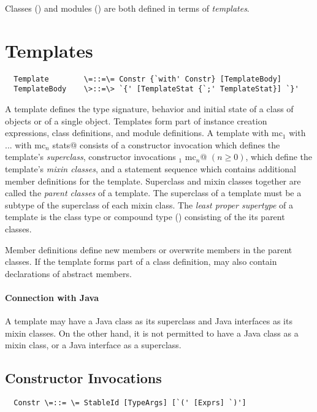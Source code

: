 \documentclass[11pt]{report}
\begin{document}
Classes () and modules
() are both defined in terms of {\em templates}.

\section{Templates}
\label{sec:templates}

\syntax\begin{verbatim}
  Template        \=::=\= Constr {`with' Constr} [TemplateBody]
  TemplateBody    \>::=\> `{' [TemplateStat {`;' TemplateStat}] `}'
\end{verbatim}

A template defines the type signature, behavior and initial state of a
class of objects or of a single object. Templates form part of
instance creation expressions, class definitions, and module
definitions.  A template
\verb@sc with mc$_1$ with ... with mc$_n$ {stats}@ consists of a
constructor invocation \verb@sc@ which defines the template's {\em
superclass}, constructor invocations \verb@mc$_1$ \commadots mc$_n$@
$(n \geq 0)$, which define the template's {\em mixin classes}, and a
statement sequence \verb@stats@ which contains additional member
definitions for the template.  Superclass and mixin classes together
are called the {\em parent classes} of a template.  The superclass of
a template must be a subtype of the superclass of each mixin class.
The {\em least proper supertype} of a template is the class type or
compound type () consisting of the its parent classes.

Member definitions define new members or overwrite members in the
parent classes.  If the template forms part of a class definition,
\verb@stats@ may also contain declarations of abstract members.

\paragraph{Connection with Java} A template may have a Java class as
its superclass and Java interfaces as its mixin classes. On the other
hand, it is not permitted to have a Java class as a mixin class, or a
Java interface as a superclass.

\subsection{Constructor Invocations}
\label{sec:constr-invoke}
\syntax\begin{verbatim}
  Constr \=::= \= StableId [TypeArgs] [`(' [Exprs] `)']  
\end{verbatim}
\end{document}
